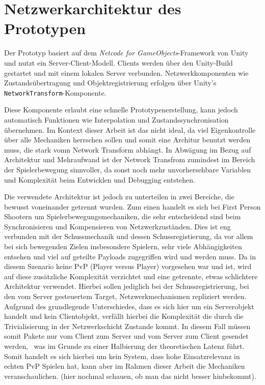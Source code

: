 \section{Netzwerkarchitektur des Prototypen}
\label{Netzwerkarchitektur}
Der Prototyp basiert auf dem \textit{Netcode for GameObjects}-Framework von Unity und nutzt ein Server-Client-Modell. Clients werden über den Unity-Build gestartet und mit einem lokalen Server verbunden. Netzwerkkomponenten wie Zustandsübertragung und Objektregistrierung erfolgen über Unity's \texttt{NetworkTransform}-Komponente.

Diese Komponente erlaubt eine schnelle Prototypenerstellung, kann jedoch automatisch Funktionen wie Interpolation und Zustandssynchronisation übernehmen. Im Kontext dieser Arbeit ist das nicht ideal, da viel Eigenkontrolle über alle Mechaniken herrschen sollen und somit eine Architur benutzt werden muss, die stark vomn Network Transform abhängt. 
In Abwägung im Bezug auf Architektur und Mehraufwand ist der Network Transfrom zumindest im Bereich der Spielerbewegung sinnvoller, da sonst noch mehr unvorhersehbare Variablen und Komplexität beim Entwicklen und Debugging entstehen.  

Die verwendete Architektur ist jedoch zu unterteilen in zwei Bereiche, die bewusst voneinander getrennt wurden. Zum einen handelt es sich bei First Person Shootern um Spielerbewegungsmechaniken, die sehr entscheidend sind beim Synchronisieren und Kompensieren von Netzwerkzuständen. Dies ist eng verbunden mit der Schussmechanik und dessen Schussregistierung, da vor allem bei sich bewegenden Zielen insbesondere Spielern, sehr viele Abhängigkeiten entsehen und viel auf geteilte Payloads zugegriffen wird und werden muss.
Da in diesem Szenario keine PvP (Player versus Player) vorgesehen war und ist, wird auf diese zusätzliche Komplexität verzichtet und eine getrennte, etwas schlichtere Architektur verwendet. Hierbei sollen jediglich bei der Schussregistrierung, bei den vom Server gesteuertem Target, Netzwerkmechanismen repliziert werden.
Aufgrund des grundlegende Unterschiedes, dass es sich hier um ein Serverobjekt handelt und kein Clientobjekt, verfällt hierbei die Komplexität die durch die Trivialisierung in der Netzwerkschicht Zustande kommt. 
In diesem Fall müssen somit Pakete nur vom Client zum Server und vom Server zum Client gesendet werden, ~was im Grunde zu einer Halbierung der theoretischen Latenz führt. 
Somit handelt es sich hierbei um kein System, dass hohe Einsatzrelevanz in echten PvP Spielen hat, kann aber im Rahmen dieser Arbeit die Mechaniken veranschaulichen. (hier nochmal schauen, ob man das nicht besser hinbekommt).

